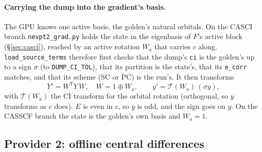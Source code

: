 \documentclass[11pt]{article}
\newcommand{\code}[1]{\texttt{#1}}
\begin{document}
\paragraph{Carrying the dump into the gradient's basis.} The GPU knows one
active basis, the golden's natural orbitals. On the CASCI branch
\code{nevpt2\_grad.py} holds the state in the eigenbasis of $F$'s active block
(\S\ref{sec:casci}), reached by an active rotation $W_a$ that carries $c$
along. \code{load\_source\_terms} therefore first checks that the dump's
\code{ci} is the golden's up to a sign $\sigma$ (to \code{DUMP\_CI\_TOL}),
that its partition is the state's, that its \code{e\_corr} matches, and that
its scheme (SC or PC) is the run's. It then transforms
\begin{equation}
  Y' = W^{\mathsf T} Y\,W,\quad W = 1\oplus W_a,\qquad
  y' = \mathcal T(W_a)\,(\sigma y),
  \label{eq:dumprot}
\end{equation}
with $\mathcal T(W_a)$ the CI transform for the orbital rotation (orthogonal,
so $y$ transforms as $c$ does). $E$ is even in $c$, so $y$ is odd, and the sign
goes on $y$. On the CASSCF branch the state is the golden's own basis and
$W_a = 1$.

\subsection{Provider 2: offline central differences}
\label{sec:src-fd}
\end{document}
